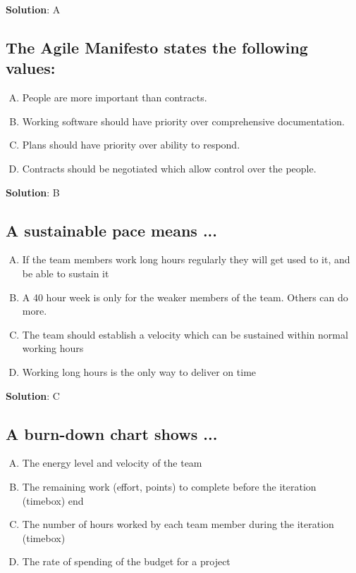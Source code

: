 \textbf{Solution}: A


\subsection{The Agile Manifesto states the following values:}
\begin{enumerate}[A)]
  \item People are more important than contracts.
  \item Working software should have priority over comprehensive documentation.
  \item Plans should have priority over ability to respond.
  \item Contracts should be negotiated which allow control over the people.
\end{enumerate}

\textbf{Solution}: B


\subsection{A sustainable pace means ...}
\begin{enumerate}[A)]
  \item If the team members work long hours regularly they will get used to it, and be able to sustain it
  \item A 40 hour week is only for the weaker members of the team. Others can do more.
  \item The team should establish a velocity which can be sustained within normal working hours
  \item Working long hours is the only way to deliver on time
\end{enumerate}

\textbf{Solution}: C


\subsection{A burn-down chart shows ...}
\begin{enumerate}[A)]
  \item The energy level and velocity of the team
  \item The remaining work (effort, points) to complete before the iteration (timebox) end
  \item The number of hours worked by each team member during the iteration (timebox)
  \item The rate of spending of the budget for a project
\end{enumerate}

